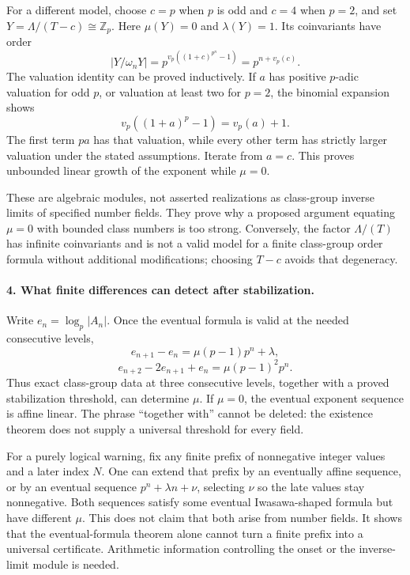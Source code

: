 \documentclass[11pt]{article}
\begin{document}
For a different model, choose $c=p$ when $p$ is odd and $c=4$ when $p=2$, and set $Y=\Lambda/(T-c)\cong\mathbb Z_p$. Here $\mu(Y)=0$ and $\lambda(Y)=1$. Its coinvariants have order
\[
 |Y/\omega_nY|=p^{v_p((1+c)^{p^n}-1)}
 =p^{n+v_p(c)}.
\]
The valuation identity can be proved inductively. If $a$ has positive $p$-adic valuation for odd $p$, or valuation at least two for $p=2$, the binomial expansion shows
\[
 v_p((1+a)^p-1)=v_p(a)+1.
\]
The first term $pa$ has that valuation, while every other term has strictly larger valuation under the stated assumptions. Iterate from $a=c$. This proves unbounded linear growth of the exponent while $\mu=0$.

These are algebraic modules, not asserted realizations as class-group inverse limits of specified number fields. They prove why a proposed argument equating $\mu=0$ with bounded class numbers is too strong. Conversely, the factor $\Lambda/(T)$ has infinite coinvariants and is not a valid model for a finite class-group order formula without additional modifications; choosing $T-c$ avoids that degeneracy.

\paragraph{4. What finite differences can detect after stabilization.}
Write $e_n=\log_p|A_n|$. Once the eventual formula is valid at the needed consecutive levels,
\[
 e_{n+1}-e_n=\mu(p-1)p^n+\lambda,
\]
\[
 e_{n+2}-2e_{n+1}+e_n=\mu(p-1)^2p^n.
\]
Thus exact class-group data at three consecutive levels, together with a proved stabilization threshold, can determine $\mu$. If $\mu=0$, the eventual exponent sequence is affine linear. The phrase ``together with'' cannot be deleted: the existence theorem does not supply a universal threshold for every field.

For a purely logical warning, fix any finite prefix of nonnegative integer values and a later index $N$. One can extend that prefix by an eventually affine sequence, or by an eventual sequence $p^n+\lambda n+\nu$, selecting $\nu$ so the late values stay nonnegative. Both sequences satisfy some eventual Iwasawa-shaped formula but have different $\mu$. This does not claim that both arise from number fields. It shows that the eventual-formula theorem alone cannot turn a finite prefix into a universal certificate. Arithmetic information controlling the onset or the inverse-limit module is needed.
\end{document}
